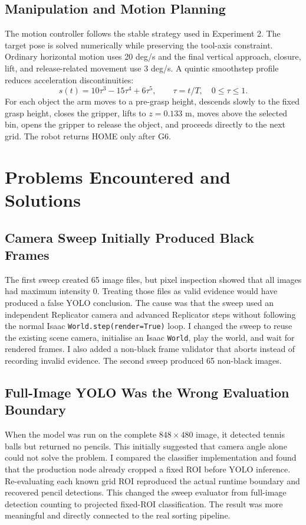 \documentclass[12pt,a4paper]{article}
\begin{document}
\subsection{Manipulation and Motion Planning}

The motion controller follows the stable strategy used in Experiment 2. The target pose is solved numerically while preserving the tool-axis constraint. Ordinary horizontal motion uses 20 deg/s and the final vertical approach, closure, lift, and release-related movement use 3 deg/s. A quintic smoothstep profile reduces acceleration discontinuities:
\begin{equation}
  s(t)=10\tau^3-15\tau^4+6\tau^5, \qquad \tau=t/T,\quad 0\leq\tau\leq1.
\end{equation}
For each object the arm moves to a pre-grasp height, descends slowly to the fixed grasp height, closes the gripper, lifts to $z=0.133$ m, moves above the selected bin, opens the gripper to release the object, and proceeds directly to the next grid. The robot returns HOME only after G6.

\section{Problems Encountered and Solutions}

\subsection{Camera Sweep Initially Produced Black Frames}

The first sweep created 65 image files, but pixel inspection showed that all images had maximum intensity 0. Treating those files as valid evidence would have produced a false YOLO conclusion. The cause was that the sweep used an independent Replicator camera and advanced Replicator steps without following the normal Isaac \texttt{World.step(render=True)} loop. I changed the sweep to reuse the existing scene camera, initialise an Isaac \texttt{World}, play the world, and wait for rendered frames. I also added a non-black frame validator that aborts instead of recording invalid evidence. The second sweep produced 65 non-black images.

\subsection{Full-Image YOLO Was the Wrong Evaluation Boundary}

When the model was run on the complete $848\times480$ image, it detected tennis balls but returned no pencils. This initially suggested that camera angle alone could not solve the problem. I compared the classifier implementation and found that the production node already cropped a fixed ROI before YOLO inference. Re-evaluating each known grid ROI reproduced the actual runtime boundary and recovered pencil detections. This changed the sweep evaluator from full-image detection counting to projected fixed-ROI classification. The result was more meaningful and directly connected to the real sorting pipeline.
\end{document}
